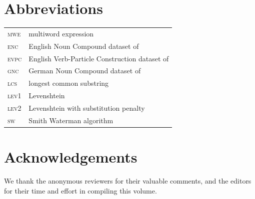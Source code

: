 \documentclass[output=paper,modfonts,nonflat]{langsci/langscibook}
\begin{document}
\section*{Abbreviations}

\begin{tabularx}{.48\textwidth}{ll}
   \textsc{mwe} & multiword expression  \\
  \textsc{enc} &  English Noun Compound dataset of \citet{reddy2011a}  \\
\textsc{evpc} &  English Verb-Particle Construction dataset of \citet{bannard2003}  \\
\textsc{gnc}  &  German Noun Compound dataset of \citet{SchulteImWalde+:2013} \\
 \textsc{lcs} &   longest common substring  \\
  \textsc{lev1} &  Levenshtein  \\
  \textsc{lev2} &  Levenshtein with substitution penalty \\
 \textsc{sw}  & Smith Waterman algorithm  \\
  \end{tabularx}


\section*{Acknowledgements}
We thank the anonymous reviewers for their valuable
comments, and the editors for their time and effort in compiling
this volume.

{\sloppy
\printbibliography[heading=subbibliography,notkeyword=this]
}
\end{document}
